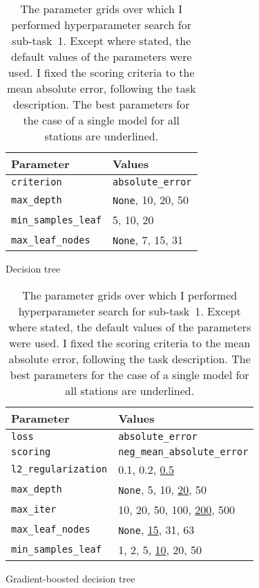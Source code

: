 \documentclass[11pt]{extarticle}
\newcommand{\None}{\texttt{None}}
\begin{document}
\begin{table}
  \centering
  \begin{subfigure}{\textwidth}
    \centering
    \begin{tabular}{ll}
      \toprule
      Parameter                   & Values
      \\
      \midrule
      \texttt{criterion}          & \texttt{absolute\_error}
      \\
      \midrule
      \texttt{max\_depth}         & \None, 10, 20, 50
      \\
      \texttt{min\_samples\_leaf} & 5, 10, 20
      \\
      \texttt{max\_leaf\_nodes}   & \None, 7, 15, 31
      \\
      \bottomrule
    \end{tabular}
    \caption{Decision tree}
    \label{tab:chart-parameters-subtask-1-1}
  \end{subfigure}
  \par\bigskip\bigskip
  \begin{subfigure}{\textwidth}
    \centering
    \begin{tabular}{ll}
      \toprule
      Parameter                   & Values
      \\
      \midrule
      \texttt{loss}               & \texttt{absolute\_error}
      \\
      \texttt{scoring}            & \texttt{neg\_mean\_absolute\_error}
      \\
      \midrule
      \texttt{l2\_regularization} & 0.1, 0.2, \underline{0.5}
      \\
      \texttt{max\_depth}         & \None, 5, 10, \underline{20}, 50
      \\
      \texttt{max\_iter}          & 10, 20, 50, 100, \underline{200}, 500
      \\
      \texttt{max\_leaf\_nodes}   & \None, \underline{15}, 31, 63
      \\
      \texttt{min\_samples\_leaf} & 1, 2, 5, \underline{10}, 20, 50
      \\
      \bottomrule
    \end{tabular}
    \caption{Gradient-boosted decision tree}
    \label{tab:chart-parameters-subtask-1-2}
  \end{subfigure}
  \caption{The parameter grids over which I performed hyperparameter search for sub-task~1.
    Except where stated, the default values of the parameters were used.
    I fixed the scoring criteria to the mean absolute error, following the task
    description.
    The best parameters for the case of a single model for all stations are underlined.
  }
  \label{tab:chart-parameters-subtask-1}
\end{table}
\end{document}
